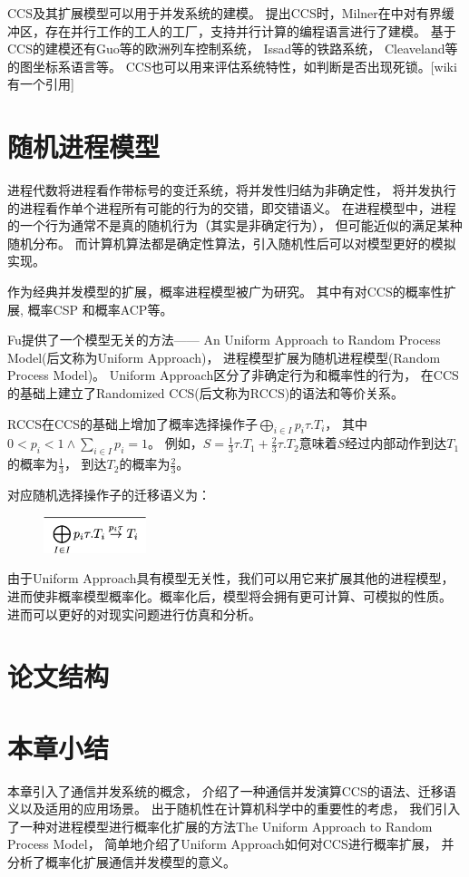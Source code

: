    CCS及其扩展模型可以用于并发系统的建模。
   提出CCS时，Milner在\cite{2}中对有界缓冲区，存在并行工作的工人的工厂，支持并行计算的编程语言进行了建模。
   基于CCS的建模还有Guo等的欧洲列车控制系统\cite{16}，
   Issad等的铁路系统\cite{17}，
   Cleaveland等的图坐标系语言\cite{18}等。
   CCS也可以用来评估系统特性，如判断是否出现死锁。[wiki有一个引用]
   \section{随机进程模型}

   进程代数将进程看作带标号的变迁系统，将并发性归结为非确定性，
   将并发执行的进程看作单个进程所有可能的行为的交错，即交错语义。
   在进程模型中，进程的一个行为通常不是真的随机行为（其实是非确定行为），
   但可能近似的满足某种随机分布。
   而计算机算法都是确定性算法，引入随机性后可以对模型更好的模拟实现。

   作为经典并发模型的扩展，概率进程模型被广为研究。
   其中有对CCS的概率性扩展\cite{9,10},
   概率CSP\cite{11} 和概率ACP\cite{12}等。

   Fu提供了一个模型无关的方法—— An Uniform Approach to Random Process Model(后文称为Uniform Approach)，
   进程模型扩展为随机进程模型(Random Process Model)。
   Uniform Approach区分了非确定行为和概率性的行为，
   在CCS的基础上建立了Randomized CCS(后文称为RCCS)的语法和等价关系。

   RCCS在CCS的基础上增加了概率选择操作子$\bigoplus_{i\in I}p_i\tau.T_i$，
   其中$0<p_i<1 \wedge \sum_{i\in I}p_i = 1$。
   例如，$S=\frac{1}{3}\tau.T_1+\frac{2}{3}\tau.T_2$意味着$S$经过内部动作到达$T_1$的概率为$\frac{1}{3}$，
   到达$T_2$的概率为$\frac{2}{3}$。

   对应随机选择操作子的迁移语义为：
   \begin{figure}[!htbp]
    \small
    \centering
    \includegraphics[width=3cm]{../figure/rccs.png}
    \caption[]{}
     \label{fig_rccs}
 \end{figure}

   由于Uniform Approach具有模型无关性，我们可以用它来扩展其他的进程模型，
   进而使非概率模型概率化。概率化后，模型将会拥有更可计算、可模拟的性质。
   进而可以更好的对现实问题进行仿真和分析。

\section{论文结构}

\section{本章小结}
本章引入了通信并发系统的概念，
介绍了一种通信并发演算CCS的语法、迁移语义以及适用的应用场景。
出于随机性在计算机科学中的重要性的考虑，
我们引入了一种对进程模型进行概率化扩展的方法The Uniform Approach to Random Process Model，
简单地介绍了Uniform Approach如何对CCS进行概率扩展，
并分析了概率化扩展通信并发模型的意义。
